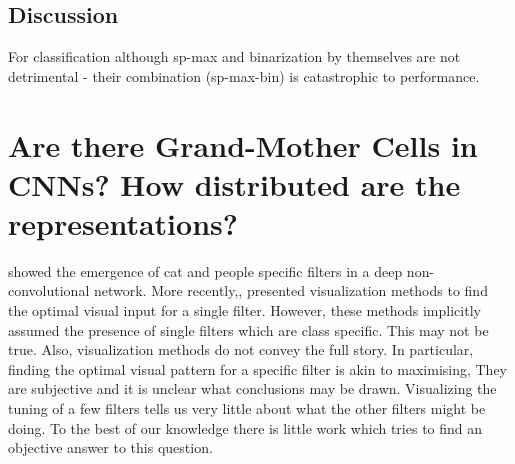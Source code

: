 \documentclass[runningheads]{llncs}
\begin{document}
\setlength{\tabcolsep}{1pt}
\begin{table}[t!]
\begin{center}
\caption{Ablation study on PASCAL Object Detection using conv-5 features\cite{Rcnn}. Binarization leads to negligible drop in performance whereas as \textit{sp-max} causes a large drop in performance.}
\label{table:det-ablation}
\end{center}
\end{table}
\setlength{\tabcolsep}{1.4pt}


\subsection{Discussion}
For classification although sp-max and binarization by themselves are not detrimental - their combination (sp-max-bin) is catastrophic to performance.

\section{Are there Grand-Mother Cells in CNNs? How distributed are the representations?}
\label{sec:grand-mother}
 

\cite{GoogleCat} showed the emergence of cat and people specific filters in a deep non-convolutional network. More recently,\cite{DeConv}, \cite{Simonyan} presented visualization methods to find the optimal visual input for a single filter. However, these methods implicitly assumed the presence of single filters which are class specific. This may not be true. Also, visualization methods do not convey the full story. In particular, finding the  optimal visual pattern for a specific filter is akin to maximising,  They are subjective and it is unclear what conclusions may be drawn. Visualizing the tuning of a few filters tells us very little about what the other filters might be doing. To the best of our knowledge there is little work which tries to find an objective answer to this question.
\end{document}
